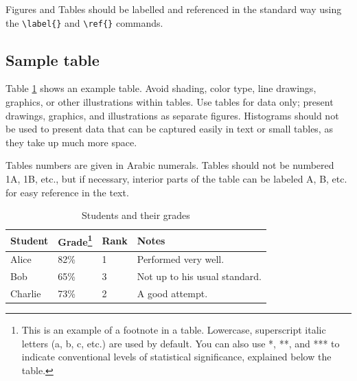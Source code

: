 \documentclass[9pt, onecolumn,twoside]{gsajnl}
\begin{document}

Figures and Tables should be labelled and referenced in the standard way using the \verb|\label{}| and \verb|\ref{}| commands.

\subsection{Sample table}

Table \ref{tab:shape-functions} shows an example table. Avoid shading, color type, line drawings, graphics, or other illustrations within tables. Use tables for data only; present drawings, graphics, and illustrations as separate figures. Histograms should not be used to present data that can be captured easily in text or small tables, as they take up much more space.

Tables numbers are given in Arabic numerals. Tables should not be numbered 1A, 1B, etc., but if necessary, interior parts of the table can be labeled A, B, etc. for easy reference in the text.

\begin{table}[p]
\centering
\caption{Students and their grades}
\begin{tableminipage}{\textwidth}
\begin{tabularx}{\textwidth}{@{}XXXX@{}}
\hline
{\bf Student} & {\bf Grade}\footnote{This is an example of a footnote in a table. Lowercase, superscript italic letters (a, b, c, etc.) are used by default. You can also use *, **, and *** to indicate conventional levels of statistical significance, explained below the table.} & {\bf Rank} & {\bf Notes} \\
\hline
Alice & 82\% & 1 & Performed very well.\\
Bob & 65\% & 3 & Not up to his usual standard.\\
Charlie & 73\% & 2 & A good attempt.\\
\hline
\end{tabularx}
  \label{tab:shape-functions}
\end{tableminipage}
\end{table}
\end{document}
